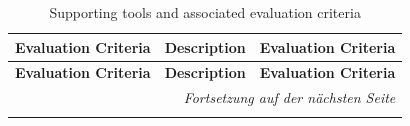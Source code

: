 \documentclass{template/openetcs_article}
\begin{document}
  
    \begin{longtable}[htbp]{p{4cm}|p{5cm}|p{5cm}}
    
    \caption{Supporting tools and associated evaluation criteria}   
    \label{ToolEvalCrit} \\
    
          \textbf{Evaluation Criteria} & \textbf{Description} & \textbf{Evaluation Criteria} \\
            \hline
        \endfirsthead
        
        \textbf{Evaluation Criteria} & \textbf{Description} & \textbf{Evaluation Criteria} \\
        \hline
        \endhead
        
        \hline\multicolumn{3}{r}{\textit{Fortsetzung auf der
        n\"{a}chsten Seite}}\\\hline
        \endfoot
        \hline
        \endlastfoot
    

\end{longtable}
\end{document}
